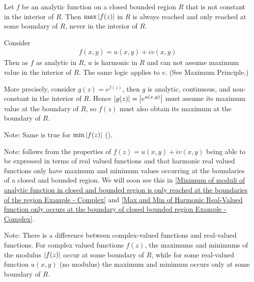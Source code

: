 \documentclass[12pt, english]{book}
\makeatletter
\renewenvironment{proof}[1][\proofname]{\par
	\pushQED{\qed}%
	\normalfont \topsep6\p@\@plus6\p@\relax
	\list{}{%
		\settowidth{\leftmargin}{\itshape\proofname:\hskip\labelsep}%
		\setlength{\labelwidth}{0pt}%
		\setlength{\itemindent}{-\leftmargin}%
	}%
	\item[\hskip\labelsep\itshape#1\@addpunct{:}]\ignorespaces
	}{ \popQED\endlist\@endpefalse}
\makeatother
\begin{document}
	\begin{corollary}
		\label{Maximum of moduli of analytic function in closed and bounded region is only reached at the boundaries of the region Corollary - Complex}
		Let \(f\) be an analytic function on a closed bounded region \(R\) that is not constant in the interior of \(R\). Then \(\max\abs{f(z)}\) in \(R\) is always reached and only reached at some boundary of \(R\), never in the interior of \(R\).
	\end{corollary}
	\begin{proof}
		Consider 
		\begin{align*}
			f(x,y) = u(x,y) + iv(x,y)
		\end{align*}
		Then as \(f\) as analytic in \(R\), \(u\) is harmonic in \(R\) and can not assume maximum value in the interior of \(R\). The same logic applies to \(v\). (See Maximum Principle.)
		
		More precisely, consider \(g(z) = e^{f(z)}\), then \(g\) is analytic, continuous, and non-constant in the interior of \(R\). Hence \(\abs{g(z)} = \abs{e^{u(x,y)}}\) must assume its maximum value at the boundary of \(R\), so \(f(z)\) must also obtain its maximum at the boundary of \(R\).
	\end{proof}
	
	Note: Same is true for \(\min\abs{f(z)}\) ().
	
	Note:  follows from the properties of \(f(z) = u(x,y) + iv(x,y)\) being able to be expressed in terms of real valued functions and that harmonic real valued functions only have maximum and minimum values occurring at the boundaries of a closed and bounded region. We will soon see this in \cref{Minimum of moduli of analytic function in closed and bounded region is only reached at the boundaries of the region Example - Complex} and \cref{Max and Min of Harmonic Real-Valued function only occurs at the boundary of closed bounded region Example - Complex}.
	
	Note: There is a difference between complex-valued functions and real-valued functions. For complex valued functions \(f(z)\), the maximums and minimums of the modulus \(\abs{f(z)}\) occur at some boundary of \(R\), while for some real-valued function \(u(x,y)\) (no modulus) the maximum and minimum occurs only at some boundary of \(R\).
	
\end{document}
